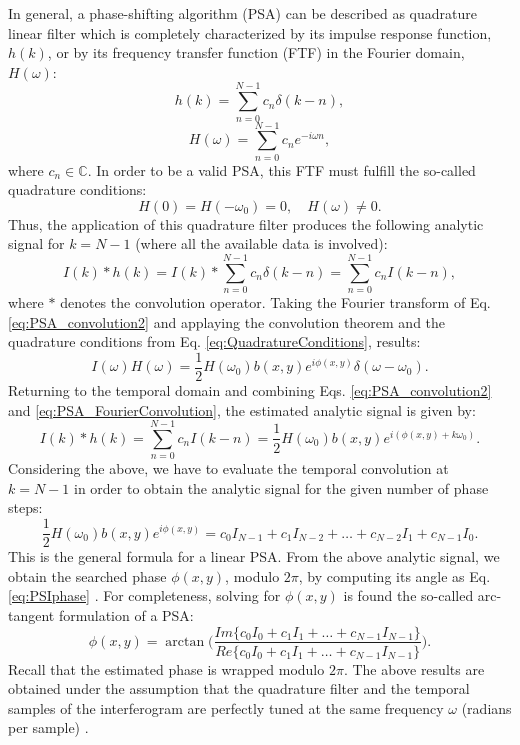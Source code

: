 In general, a phase-shifting algorithm (PSA) can be described as quadrature linear
filter which is completely characterized by its impulse response function, $h(k)$,
or by its frequency transfer function (FTF) in the Fourier domain, $H(\omega)$:
\begin{equation}
 h(k)=\sum^{N-1}_{n=0} c_n \delta(k-n),
\end{equation}
\begin{equation}
 H(\omega)=\sum^{N-1}_{n=0} c_n e^{-i\omega n},
\end{equation}
where ${c_n} \in \mathbb{C}$. In order to be a valid PSA, this FTF must fulfill
the so-called quadrature conditions:
\begin{equation}\label{eq:QuadratureConditions}
 H(0)=H(-\omega_0)=0, \quad H(\omega)\not=0.
\end{equation}
Thus, the application of this quadrature filter produces the following analytic
signal for $k = N-1$ (where all the available data is involved):
\begin{equation}\label{eq:PSA_convolution2}
 I(k)*h(k)=I(k)*\sum^{N-1}_{n=0} c_n \delta(k-n) = \sum^{N-1}_{n=0} c_n I(k-n),
\end{equation}
where $*$ denotes the convolution operator. Taking the Fourier transform of Eq. 
\eqref{eq:PSA_convolution2} and applaying the convolution theorem and the 
quadrature conditions from Eq. \eqref{eq:QuadratureConditions}, results:
\begin{equation}\label{eq:PSA_FourierConvolution}
 I(\omega)H(\omega)= \frac{1}{2} H(\omega_0)b(x,y) e^{i\phi(x,y)} \delta(\omega-
\omega_0).
\end{equation}
Returning to the temporal domain and combining Eqs. 
\eqref{eq:PSA_convolution2} and \eqref{eq:PSA_FourierConvolution}, the estimated 
analytic signal is given by:
\begin{equation}
 I(k)*h(k)= \sum^{N-1}_{n=0} c_n I(k-n) = \frac{1}{2} H(\omega_0)b(x,y) 
e^{i(\phi(x,y)+k\omega_0)}.
\end{equation}
Considering the above, we have to evaluate the temporal convolution at $k=N-1$ in
order to obtain the analytic signal for the given number of phase steps:
\begin{equation}
  \frac{1}{2} H(\omega_0)b(x,y) e^{i\phi(x,y)} = c_0 I_{N-1} + c_1 I_{N-2}+ \dots 
  + c_{N-2} I_{1}+ c_{N-1} I_{0}.
\end{equation}
This is the general formula for a linear PSA.
From the above analytic signal, we obtain the searched phase $\phi(x,y)$, modulo
$2\pi$, by computing its angle as Eq. \eqref{eq:PSIphase} \cite{Surrel:96,
Wyant:75,Kujawinska2006}. 
For completeness, 
solving for $\phi(x,y)$ is found the so-called arc-tangent formulation of a PSA:
\begin{equation}
 \phi(x,y) = \arctan \Bigg(\frac{Im\{c_0I_0+c_1I_1 + \dots + c_{N-1}
I_{N-1}\}}{Re\{c_0I_0+c_1I_1 + \dots + c_{N-1} I_{N-1}\}}  \Bigg).
\end{equation}
Recall that the estimated phase is wrapped modulo $2 \pi$.
The above results are obtained under the assumption that the quadrature filter
and the temporal samples of the interferogram are perfectly tuned at the same
frequency $\omega$ (radians per sample) \cite{Gonzalez:11}.

